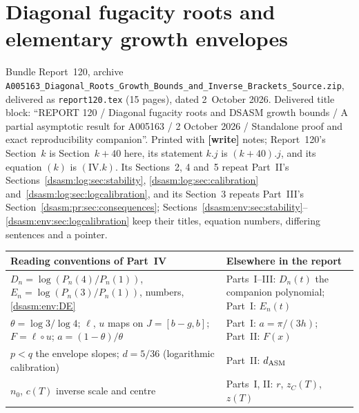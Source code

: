 \documentclass[11pt,letterpaper]{article}
\theoremstyle{remark}\newtheorem{remark}[theorem]{Remark}
\newcommand{\file}[1]{\nolinkurl{#1}}
\newcommand{\partsource}[1]{\par\noindent\begin{minipage}{\textwidth}\small #1\end{minipage}\par\medskip}
\newcommand{\parteqs}[1]{\setcounter{equation}{0}%
 \renewcommand{\theequation}{#1\arabic{equation}}%
 \renewcommand{\theHequation}{#1\arabic{equation}}}
\begin{document}
\part{Diagonal fugacity roots and elementary growth envelopes}\label{dsasm:env:part}
\parteqs{IV.}
\partsource{Bundle Report~120, archive \file{A005163_Diagonal_Roots_Growth_Bounds_and_Inverse_Brackets_Source.zip}, delivered as \file{report120.tex} (15 pages), dated 2~October 2026. Delivered title block: ``REPORT 120 / Diagonal fugacity roots and DSASM growth bounds / A partial asymptotic result for A005163 / 2 October 2026 / Standalone proof and exact reproducibility companion''. Printed with \textbf{[write]} notes; Report~120's Section~$k$ is Section~$k+40$ here, its statement $k.j$ is $(k+40).j$, and its equation $(k)$ is $(\mathrm{IV}.k)$. Its Sections~2, 4 and~5 repeat Part~II's Sections~\ref{dsasm:log:sec:stability}, \ref{dsasm:log:sec:calibration} and~\ref{dsasm:log:sec:logcalibration}, and its Section~3 repeats Part~III's Section~\ref{dsasm:pr:sec:consequences}; Sections~\ref{dsasm:env:sec:stability}--\ref{dsasm:env:sec:logcalibration} keep their titles, equation numbers, differing sentences and a pointer.}
\begin{center}
\small
\begin{tabular}{@{}>{\raggedright\arraybackslash}p{} >{\raggedright\arraybackslash}p{}@{}}
\toprule
Reading conventions of Part~IV & Elsewhere in the report\\
\midrule
$D_n=\log(P_n(4)/P_n(1))$, $E_n=\log(P_n(3)/P_n(1))$, numbers, \eqref{dsasm:env:DE} & Parts~I--III: $D_n(t)$ the companion polynomial; Part~I: $E_n(t)$\\
$\theta=\log3/\log4$; $\ell$, $u$ maps on $J=[b-g,b]$; $F=\ell\circ u$; $a=(1-\theta)/\theta$ & Part~I: $a=\pi/(3h)$; Part~II: $F(x)$\\
$p<q$ the envelope slopes; $d=5/36$ (logarithmic calibration) & Part~II: $d_{\rm ASM}$\\
$n_0$, $c(T)$ inverse scale and centre & Parts~I, II: $r$, $z_C(T)$, $z(T)$\\
\bottomrule
\end{tabular}
\end{center}
\end{document}
